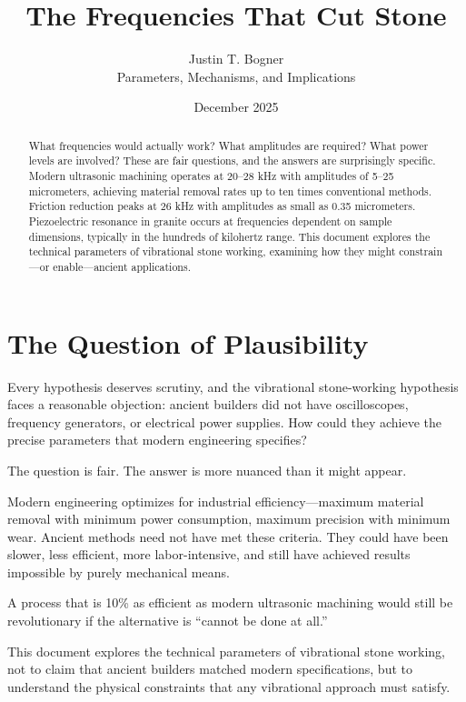 \documentclass[11pt]{article}
\title{The Frequencies That Cut Stone}
\author{Justin T. Bogner\\[0.5em]\small Parameters, Mechanisms, and Implications}
\date{December 2025}
\begin{document}
\maketitle
\thispagestyle{empty}

\begin{abstract}
What frequencies would actually work? What amplitudes are required? What power levels are involved? These are fair questions, and the answers are surprisingly specific. Modern ultrasonic machining operates at 20--28 kHz with amplitudes of 5--25 micrometers, achieving material removal rates up to ten times conventional methods. Friction reduction peaks at 26 kHz with amplitudes as small as 0.35 micrometers. Piezoelectric resonance in granite occurs at frequencies dependent on sample dimensions, typically in the hundreds of kilohertz range. This document explores the technical parameters of vibrational stone working, examining how they might constrain---or enable---ancient applications.
\end{abstract}

\tableofcontents
\newpage

\section{The Question of Plausibility}

Every hypothesis deserves scrutiny, and the vibrational stone-working hypothesis faces a reasonable objection: ancient builders did not have oscilloscopes, frequency generators, or electrical power supplies. How could they achieve the precise parameters that modern engineering specifies?

The question is fair. The answer is more nuanced than it might appear.

Modern engineering optimizes for industrial efficiency---maximum material removal with minimum power consumption, maximum precision with minimum wear. Ancient methods need not have met these criteria. They could have been slower, less efficient, more labor-intensive, and still have achieved results impossible by purely mechanical means.

A process that is 10\% as efficient as modern ultrasonic machining would still be revolutionary if the alternative is ``cannot be done at all.''

This document explores the technical parameters of vibrational stone working, not to claim that ancient builders matched modern specifications, but to understand the physical constraints that any vibrational approach must satisfy.
\end{document}
